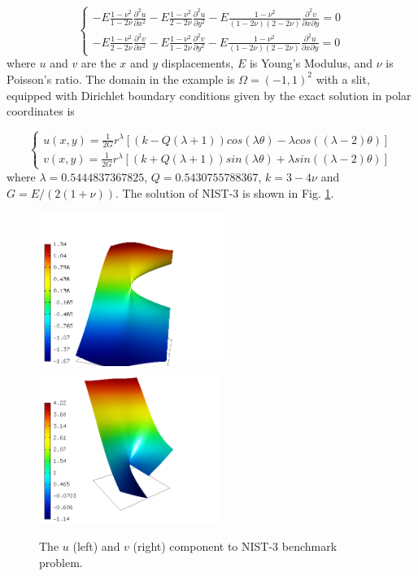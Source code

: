 \documentclass[12pt]{elsarticle}
\begin{document}
\begin{equation}\label{crack}
\left\{
\begin{array}{l}
\displaystyle
-E \frac{1-\nu^2}{1-2\nu} \frac{\partial^{2} u}{\partial x^{2}} - E\frac{1-\nu^2}{2-2 \nu} \frac{\partial^{2} u}{\partial y^{2}}
-E \frac{1-\nu^2}{(1-2\nu)(2-2\nu)} \frac{\partial^{2} v}{\partial x \partial y} = 0 \\
\displaystyle
-E \frac{1-\nu^2}{2-2\nu} \frac{\partial^{2} v}{\partial x^{2}} - E\frac{1-\nu^2}{1-2\nu} \frac{\partial^{2} v}{\partial y^{2}}
-E \frac{1-\nu^2}{(1-2\nu)(2-2\nu)} \frac{\partial^{2} u}{\partial x \partial y} = 0
\end{array}
\right.
\end{equation}
where $u$ and $v$ are the
$x$ and $y$ displacements, $E$ is Young's Modulus,
and $\nu$ is Poisson's ratio.
The domain in the example is $\Omega = (-1, 1)^2$ with a slit,
equipped with Dirichlet boundary conditions given by the
exact solution in polar coordinates is

\[
\left\{
\begin{array}{l}
\displaystyle
u(x, y) = \frac{1}{2G} r^{\lambda}[(k - Q(\lambda + 1))cos(\lambda \theta) - \lambda cos((\lambda - 2) \theta)]  \\
\displaystyle
v(x, y) = \frac{1}{2G} r^{\lambda}[(k + Q(\lambda + 1))sin(\lambda \theta) + \lambda sin((\lambda - 2) \theta)]
\end{array}
\right.
\]
where $\lambda = 0.5444837367825$, $Q = 0.5430755788367$,
$k = 3 - 4 \nu$ and $G = E / (2(1 + \nu))$.
The solution of NIST-3 is shown in Fig. \ref{fig:sln-nist03}.

\begin{figure}[H]
\centering
\includegraphics[height=5cm]{nist/nist-3/solution-u.png}\ \
\includegraphics[height=5cm]{nist/nist-3/solution-v.png}
\caption{The $u$ (left) and $v$ (right) component to NIST-3 benchmark problem.}
\label{fig:sln-nist03}
\end{figure}
\end{document}
